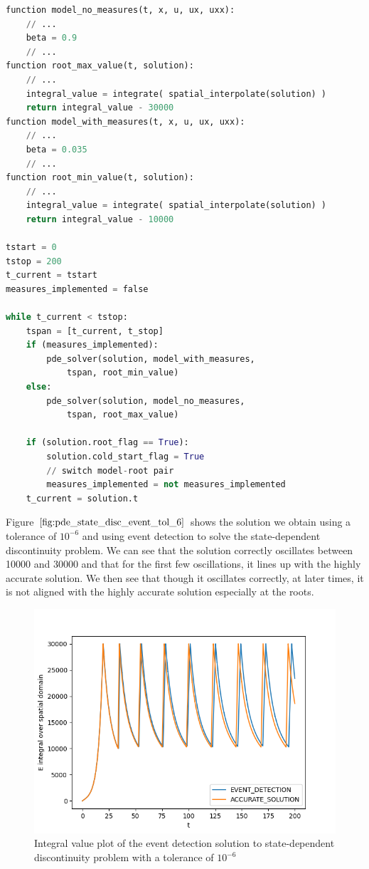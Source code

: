 \documentclass{article}
\begin{document}
\begin{minipage}{\linewidth}
\begin{lstlisting}[language=Python]
function model_no_measures(t, x, u, ux, uxx):
	// ...
	beta = 0.9
	// ...
function root_max_value(t, solution):
	// ...
	integral_value = integrate( spatial_interpolate(solution) )
	return integral_value - 30000
function model_with_measures(t, x, u, ux, uxx):
	// ...
	beta = 0.035
	// ...
function root_min_value(t, solution):
	// ...
	integral_value = integrate( spatial_interpolate(solution) )
	return integral_value - 10000

tstart = 0
tstop = 200
t_current = tstart
measures_implemented = false

while t_current < tstop:
	tspan = [t_current, t_stop]
	if (measures_implemented):
		pde_solver(solution, model_with_measures, 
			tspan, root_min_value)
	else:
		pde_solver(solution, model_no_measures, 
			tspan, root_max_value)
	
	if (solution.root_flag == True):
		solution.cold_start_flag = True
		// switch model-root pair
		measures_implemented = not measures_implemented
	t_current = solution.t

\end{lstlisting}
\end{minipage}

Figure $\ref{fig:pde_state_disc_event_tol_6}$ shows the solution we obtain using a tolerance of $10^{-6}$ and using event detection to solve the state-dependent discontinuity problem. We can see that the solution correctly oscillates between 10000 and 30000 and that for the first few oscillations, it lines up with the highly accurate solution. We then see that though it oscillates correctly, at later times, it is not aligned with the highly accurate solution especially at the roots. 

\begin{figure}[H]
\centering
\includegraphics[width=0.7\linewidth]{./figures/pde_state_disc_event_tol_6}
\caption{Integral value plot of the event detection solution to state-dependent discontinuity problem with a tolerance of $10^{-6}$}
\label{fig:pde_state_disc_event_tol_6}
\end{figure}
\end{document}
